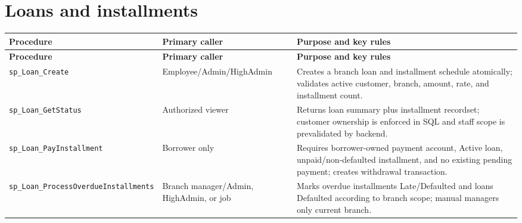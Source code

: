 \documentclass[11pt,a4paper,oneside]{report}
\begin{document}
\section{Loans and installments}
\begingroup
\footnotesize
\setlength{\tabcolsep}{4pt}
\renewcommand{\arraystretch}{1.08}
\begin{longtable}{L{0.30\textwidth}L{0.22\textwidth}L{0.41\textwidth}}
\toprule\textbf{Procedure} & \textbf{Primary caller} & \textbf{Purpose and key rules}\\\midrule\endfirsthead
\toprule\textbf{Procedure} & \textbf{Primary caller} & \textbf{Purpose and key rules}\\\midrule\endhead
\nolinkurl{sp_Loan_Create} & Employee\slash Admin\slash HighAdmin & Creates a branch loan and installment schedule atomically; validates active customer, branch, amount, rate, and installment count.\\
\nolinkurl{sp_Loan_GetStatus} & Authorized viewer & Returns loan summary plus installment recordset; customer ownership is enforced in SQL and staff scope is prevalidated by backend.\\
\nolinkurl{sp_Loan_PayInstallment} & Borrower only & Requires borrower-owned payment account, Active loan, unpaid\slash non-defaulted installment, and no existing pending payment; creates withdrawal transaction.\\
\nolinkurl{sp_Loan_ProcessOverdueInstallments} & Branch manager\slash Admin, HighAdmin, or job & Marks overdue installments Late\slash Defaulted and loans Defaulted according to branch scope; manual managers only current branch.\\
\bottomrule
\end{longtable}
\endgroup
\end{document}
